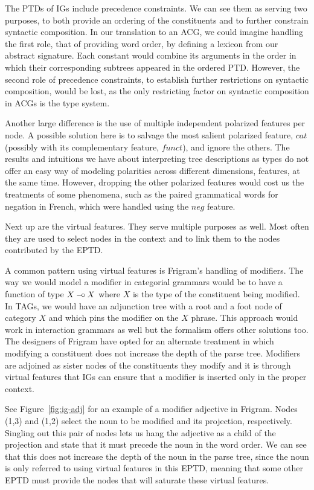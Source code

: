 The PTDs of IGs include precedence constraints. We can see them as
serving two purposes, to both provide an ordering of the constituents
and to further constrain syntactic composition. In our translation to an
ACG, we could imagine handling the first role, that of providing word
order, by defining a lexicon from our abstract signature. Each constant
would combine its arguments in the order in which their corresponding
subtrees appeared in the ordered PTD. However, the second role of
precedence constraints, to establish further restrictions on syntactic
composition, would be lost, as the only restricting factor on syntactic
composition in ACGs is the type system.

Another large difference is the use of multiple independent polarized
features per node. A possible solution here is to salvage the most
salient polarized feature, $cat$ (possibly with its complementary
feature, $funct$), and ignore the others. The results and intuitions we
have about interpreting tree descriptions as types do not offer an easy
way of modeling polarities across different dimensions, features, at the
same time. However, dropping the other polarized features would cost us
the treatments of some phenomena, such as the paired grammatical words
for negation in French, which were handled using the $neg$ feature.

Next up are the virtual features. They serve multiple purposes as
well. Most often they are used to select nodes in the context and to
link them to the nodes contributed by the EPTD.

A common pattern using virtual features is Frigram's handling of
modifiers. The way we would model a modifier in categorial grammars
would be to have a function of type $X \mathbin{{-}\mkern-3.5mu{\circ}} X$ where $X$ is the type of
the constituent being modified. In TAGs, we would have an adjunction
tree with a root and a foot node of category $X$ and which pins the
modifier on the $X$ phrase. This approach would work in interaction
grammars as well but the formalism offers other solutions too. The
designers of Frigram have opted for an alternate treatment in which
modifying a constituent does not increase the depth of the parse
tree. Modifiers are adjoined as sister nodes of the constituents they
modify and it is through virtual features that IGs can ensure that a
modifier is inserted only in the proper context.

See Figure~\ref{fig:ig-adj} for an example of a modifier adjective in
Frigram. Nodes (1,3) and (1,2) select the noun to be modified and its
projection, respectively. Singling out this pair of nodes lets us hang
the adjective as a child of the projection and state that it must
precede the noun in the word order. We can see that this does not
increase the depth of the noun in the parse tree, since the noun is only
referred to using virtual features in this EPTD, meaning that some other
EPTD must provide the nodes that will saturate these virtual features.

